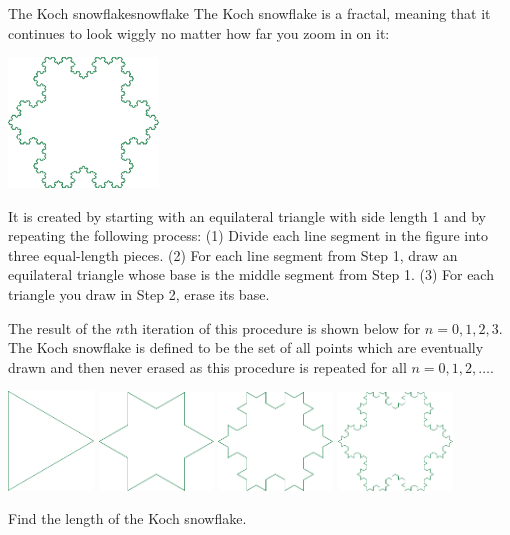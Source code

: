 \documentclass{watsonbook}
\begin{document}
\begin{exercise}{The Koch snowflake}{snowflake}
  The Koch snowflake is a fractal, meaning that it continues to look
  wiggly no matter how far you zoom in on it:

  \begin{center} 
    \includegraphics[width=4cm]{figures/koch7.pdf}
  \end{center}
  
  It is created by starting with an equilateral triangle with
  side length 1 and by repeating the following process: (1) Divide
  each line segment in the figure into three equal-length
  pieces. (2) For each line segment from Step 1, draw an equilateral
  triangle whose base is the middle segment from Step 1. (3) For
  each triangle you draw in Step 2, erase its base.

  The result of the $n$th iteration of this procedure is shown below
  for $n=0,1,2,3$. The Koch snowflake is defined to be the set of
  all points which are eventually drawn and then never erased as
  this procedure is repeated for all $n=0,1,2,\ldots$.
  
  \begin{center} 
    \includegraphics[width=2.28cm]{figures/koch0.pdf} \:
    \includegraphics[width=3.04cm]{figures/koch1.pdf} \:
    \includegraphics[width=3.04cm]{figures/koch2.pdf} \:
    \includegraphics[width=3.04cm]{figures/koch3.pdf}
  \end{center}
  
  Find the length of the Koch snowflake. 
\end{exercise}
\end{document}
